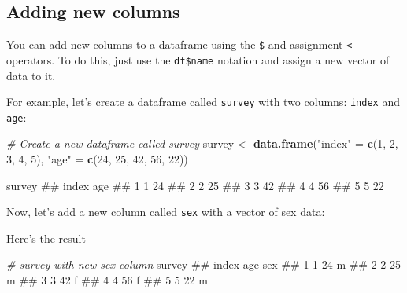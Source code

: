 \documentclass[]{book}
\newenvironment{Shaded}{\begin{snugshade}}{\end{snugshade}}
\newcommand{\KeywordTok}[1]{\textcolor[rgb]{0.13,0.29,0.53}{\textbf{#1}}}
\newcommand{\DecValTok}[1]{\textcolor[rgb]{0.00,0.00,0.81}{#1}}
\newcommand{\StringTok}[1]{\textcolor[rgb]{0.31,0.60,0.02}{#1}}
\newcommand{\CommentTok}[1]{\textcolor[rgb]{0.56,0.35,0.01}{\textit{#1}}}
\newcommand{\OperatorTok}[1]{\textcolor[rgb]{0.81,0.36,0.00}{\textbf{#1}}}
\newcommand{\NormalTok}[1]{#1}
\theoremstyle{definition}
\theoremstyle{definition}
\theoremstyle{remark}
\begin{document}
\subsection{Adding new columns}\label{adding-new-columns}

You can add new columns to a dataframe using the \texttt{\$} and
assignment \texttt{\textless{}-} operators. To do this, just use the
\texttt{df\$name} notation and assign a new vector of data to it.

For example, let's create a dataframe called \texttt{survey} with two
columns: \texttt{index} and \texttt{age}:

\begin{Shaded}
\begin{Highlighting}[]
\CommentTok{# Create a new dataframe called survey}
\NormalTok{survey <-}\StringTok{ }\KeywordTok{data.frame}\NormalTok{(}\StringTok{"index"}\NormalTok{ =}\StringTok{ }\KeywordTok{c}\NormalTok{(}\DecValTok{1}\NormalTok{, }\DecValTok{2}\NormalTok{, }\DecValTok{3}\NormalTok{, }\DecValTok{4}\NormalTok{, }\DecValTok{5}\NormalTok{),}
                     \StringTok{"age"}\NormalTok{ =}\StringTok{ }\KeywordTok{c}\NormalTok{(}\DecValTok{24}\NormalTok{, }\DecValTok{25}\NormalTok{, }\DecValTok{42}\NormalTok{, }\DecValTok{56}\NormalTok{, }\DecValTok{22}\NormalTok{))}

\NormalTok{survey}
\NormalTok{##   index age}
\NormalTok{## 1     1  24}
\NormalTok{## 2     2  25}
\NormalTok{## 3     3  42}
\NormalTok{## 4     4  56}
\NormalTok{## 5     5  22}
\end{Highlighting}
\end{Shaded}

Now, let's add a new column called \texttt{sex} with a vector of sex
data:

\begin{Shaded}
\end{Shaded}

Here's the result

\begin{Shaded}
\begin{Highlighting}[]
\CommentTok{# survey with new sex column}
\NormalTok{survey}
\NormalTok{##   index age sex}
\NormalTok{## 1     1  24   m}
\NormalTok{## 2     2  25   m}
\NormalTok{## 3     3  42   f}
\NormalTok{## 4     4  56   f}
\NormalTok{## 5     5  22   m}
\end{Highlighting}
\end{Shaded}
\end{document}

